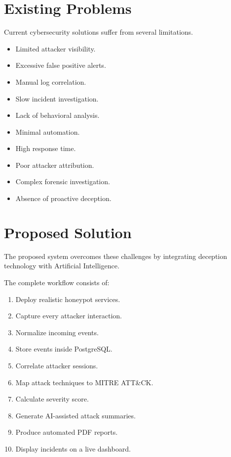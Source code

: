 \documentclass[12pt,a4paper]{report}
\begin{document}
\section{Existing Problems}

Current cybersecurity solutions suffer from several limitations.

\begin{itemize}
\item Limited attacker visibility.
\item Excessive false positive alerts.
\item Manual log correlation.
\item Slow incident investigation.
\item Lack of behavioral analysis.
\item Minimal automation.
\item High response time.
\item Poor attacker attribution.
\item Complex forensic investigation.
\item Absence of proactive deception.
\end{itemize}


\section{Proposed Solution}

The proposed system overcomes these challenges by integrating deception technology with Artificial Intelligence.

The complete workflow consists of:

\begin{enumerate}
\item Deploy realistic honeypot services.
\item Capture every attacker interaction.
\item Normalize incoming events.
\item Store events inside PostgreSQL.
\item Correlate attacker sessions.
\item Map attack techniques to MITRE ATT\&CK.
\item Calculate severity score.
\item Generate AI-assisted attack summaries.
\item Produce automated PDF reports.
\item Display incidents on a live dashboard.
\end{enumerate}
\end{document}
